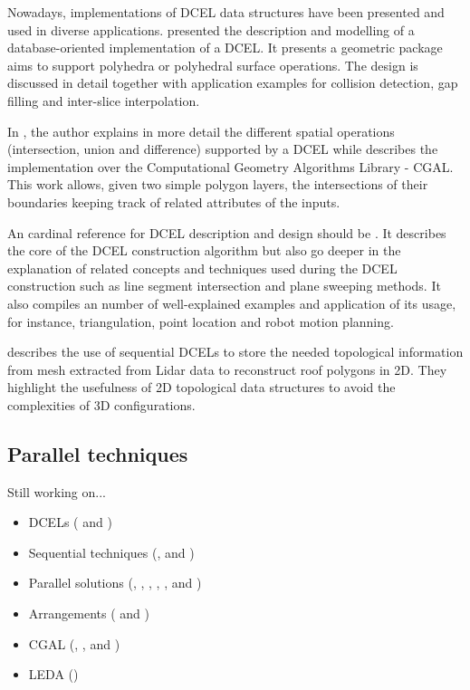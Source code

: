 Nowadays, implementations of DCEL data structures have been presented and used in diverse applications.  \cite{barequet_dcel_1998} presented the description and modelling of a database-oriented implementation of a DCEL. It presents a geometric package aims to support polyhedra or polyhedral surface operations.  The design is discussed in detail together with application examples for collision detection, gap filling and inter-slice interpolation.

In \cite{freiseisen_colored_1998}, the author explains in more detail the different spatial operations (intersection, union and difference) supported by a DCEL while describes the implementation over the Computational Geometry Algorithms Library - CGAL.  This work allows, given two simple polygon layers, the intersections of their boundaries keeping track of related attributes of the inputs.  

An cardinal reference for DCEL description and design should be \cite{berg_computational_2008}.  It describes the core of the DCEL construction algorithm but also go deeper in the explanation of related concepts and techniques used during the DCEL construction such as line segment intersection and plane sweeping methods.  It also compiles an number of well-explained examples and application of its usage, for instance, triangulation, point location and robot motion planning.

\cite{boltcheva_topological-based_2020} describes the use of sequential DCELs to store the needed topological information from mesh extracted from Lidar data to reconstruct roof polygons in 2D.  They highlight the usefulness of 2D topological data structures to avoid the complexities of 3D configurations.

\subsection*{Parallel techniques}



\vspace{1cm}
Still working on...
\begin{itemize}
    \item DCELs (\cite{muller_finding_1978} and \cite{preparata_computational_1985})
    \item Sequential techniques (\cite{barequet_dcel_1998}, \cite{boltcheva_topological-based_2020} and \cite{freiseisen_colored_1998})
    \item Parallel solutions (\cite{challa_dd-rtree_2016}, \cite{franklin_data_2018}, \cite{magalhaes_fast_2015}, \cite{puri_mapreduce_2013}, \cite{sabek_spatial_2017}, \cite{zhou_parallel_2018} and \cite{puri_efficient_2013})
    \item Arrangements (\cite{agarwal_arrangements_1998} and \cite{halperin-arrangements-2004})
    \item CGAL (\cite{fogel_cgal_2012}, \cite{flato_design_2001}, \cite{haran_experimental_2009} and \cite{wein_advanced_2007})
    \item LEDA (\cite{mehlhorn_leda_1995})
\end{itemize}


